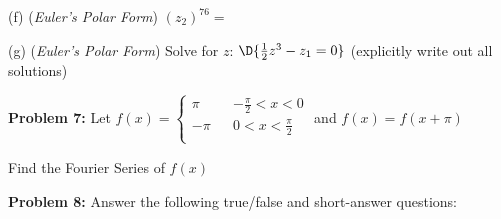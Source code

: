 \documentclass[12pt]{amsart}
\numberwithin{equation}{section}
\begin{document}
(f) ({\em Euler's Polar Form})  $(z_2)^{76} = $

\vspace{2.8cm}

(g) ({\em Euler's Polar Form}) Solve for $z$: \quad $\D{\frac{1}{2}z^3 - z_1 = 0}$ \quad (explicitly write out all solutions)
 
\thispagestyle{empty}
\newpage
\thispagestyle{empty}

{\bf Problem 7:} Let \quad
$
f(x) = 
\left\{
\begin{array}{lrc}
	 \pi & & -\frac{\pi}{2} < x < 0\\
	-\pi & & 0  < x < \frac{\pi}{2}\\
\end{array}
\right.
$  \quad and \quad $f(x) = f(x+\pi)$

\vspace{0.1cm}

Find the Fourier Series of $f(x)$ 

\thispagestyle{empty}
\newpage
\thispagestyle{empty}

%
%
%

{\bf Problem 8:} Answer the following true/false and short-answer questions:

\vspace{0.4cm}
\end{document}
